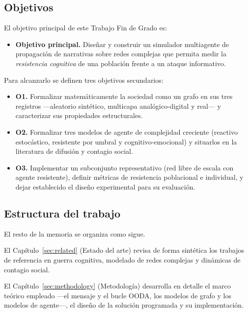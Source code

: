 \documentclass[12pt]{extarticle}
\numberwithin{equation}{section}
\begin{document}
\begin{refsection}
\subsection{Objetivos}

El objetivo principal de este Trabajo Fin de Grado es:

\begin{itemize}
    \item \textbf{Objetivo principal.} Dise\~nar y construir un simulador multiagente de propagaci\'on de narrativas sobre redes complejas que permita medir la \emph{resistencia cognitiva} de una poblaci\'on frente a un ataque informativo.
\end{itemize}

Para alcanzarlo se definen tres objetivos secundarios:

\begin{itemize}
    \item \textbf{O1.} Formalizar matem\'aticamente la sociedad como un grafo en sus tres registros —aleatorio sint\'etico, multicapa anal\'ogico-digital y real— y caracterizar sus propiedades estructurales.
    \item \textbf{O2.} Formalizar tres modelos de agente de complejidad creciente (reactivo estoc\'astico, resistente por umbral y cognitivo-emocional) y situarlos en la literatura de difusi\'on y contagio social.
    \item \textbf{O3.} Implementar un subconjunto representativo (red libre de escala con agente resistente), definir m\'etricas de resistencia poblacional e individual, y dejar establecido el dise\~no experimental para su evaluaci\'on.
\end{itemize}

\subsection{Estructura del trabajo}

El resto de la memoria se organiza como sigue. 

El Cap\'itulo~\ref{sec:related} (Estado del arte) revisa de forma sint\'etica los trabajos de referencia en guerra cognitiva, modelado de redes complejas y din\'amicas de contagio social. 

El Cap\'itulo~\ref{sec:methodology} (Metodolog\'ia) desarrolla en detalle el marco te\'orico empleado —el mensaje y el bucle OODA, los modelos de grafo y los modelos de agente—, el dise\~no de la soluci\'on programada y su implementaci\'on. 


\end{refsection}
\end{document}
